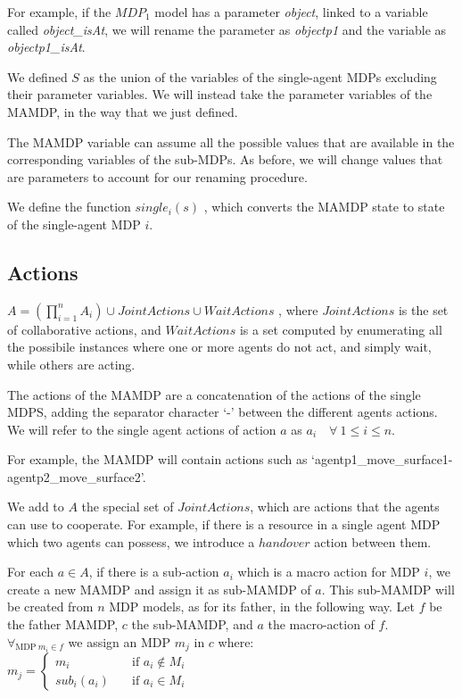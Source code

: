 For example, if the $MDP_1$ model has a parameter \textit{object}, linked to a variable called \textit{object\_isAt}, we will rename the parameter as \textit{objectp1} and the variable as \textit{objectp1\_isAt}. 

We defined $S$ as the union of the variables of the single-agent MDPs excluding their parameter variables. We will instead take the parameter variables of the MAMDP, in the way that we just defined.

The MAMDP variable can assume all the possible values that are available in the corresponding variables of the sub-MDPs. As before, we will change values that are parameters to account for our renaming procedure. 

We define the function $single_i(s)$ , which converts the MAMDP state to state of the single-agent MDP $i$.


\subsection{Actions}
$A=(\prod_{i=1}^{n} A_i) \cup JointActions \cup WaitActions$ , where $JointActions$ is the set of collaborative actions, and $WaitActions$ is a set computed by enumerating all the possibile instances where one or more agents do not act, and simply wait, while others are acting.

The actions of the MAMDP are a concatenation of the actions of the single MDPS, adding the separator character `-' between the different agents actions. We will refer to the single agent actions of action $a$ as $a_i \quad \forall \> 1\leq i \leq n$.

For example, the MAMDP will contain actions such as `agentp1\_move\_surface1-agentp2\_move\_surface2'.

We add to $A$ the special set of $JointActions$, which are actions that the agents can use to cooperate. For example, if there is a resource in a single agent MDP which two agents can possess, we introduce a $handover$ action between them. 

For each $a \in A$, if there is a sub-action $a_i$ which is a macro action for MDP $i$, we create a new MAMDP and assign it as sub-MAMDP of $a$. This sub-MAMDP will be created from $n$ MDP models, as for its father, in the following way. Let $f$ be the father MAMDP, $c$ the sub-MAMDP, and $a$ the macro-action of $f$. \\
 $ \forall_{\text{MDP}\> m_i \in f}$ we assign an MDP $m_j$ in $c$ where:\\
$m_j= \begin{cases}
	m_i & \quad \text{if } a_i \not\in M_i \\
	sub_i(a_i) & \quad \text{if } a_i \in M_i 
\end{cases}$ \\

